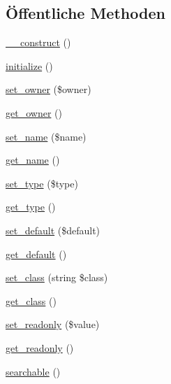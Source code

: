 \subsection*{Öffentliche Methoden}
\begin{DoxyCompactItemize}
\item 
\hyperlink{classSunhill_1_1Properties_1_1oo__property_a6b1a7e1df63cdee5c3d58625f968ed04}{\+\_\+\+\_\+construct} ()
\item 
\hyperlink{classSunhill_1_1Properties_1_1oo__property_a07ec1ce77d7088128eda4a39d30679dd}{initialize} ()
\item 
\hyperlink{classSunhill_1_1Properties_1_1oo__property_a1b97751fabe74a2295056aba5b7bd2c2}{set\+\_\+owner} (\$owner)
\item 
\hyperlink{classSunhill_1_1Properties_1_1oo__property_a8707f56ea7b58a58ce6f0a477ac83db8}{get\+\_\+owner} ()
\item 
\hyperlink{classSunhill_1_1Properties_1_1oo__property_a026fddedbb639dbcbfd9c1a4a51adcca}{set\+\_\+name} (\$name)
\item 
\hyperlink{classSunhill_1_1Properties_1_1oo__property_ab906676b3a0ff8ef7254c5ca414cc16b}{get\+\_\+name} ()
\item 
\hyperlink{classSunhill_1_1Properties_1_1oo__property_a8af77eb14beb2973cb8f33c4fed5fd72}{set\+\_\+type} (\$type)
\item 
\hyperlink{classSunhill_1_1Properties_1_1oo__property_a00479ce844d27aa79a781070aeedbb82}{get\+\_\+type} ()
\item 
\hyperlink{classSunhill_1_1Properties_1_1oo__property_af56af9157fe5d36220010fd1356b532b}{set\+\_\+default} (\$default)
\item 
\hyperlink{classSunhill_1_1Properties_1_1oo__property_aa2c90a84278fe9b3cc4960a402ffd432}{get\+\_\+default} ()
\item 
\hyperlink{classSunhill_1_1Properties_1_1oo__property_a42366744bb3a7ab25d68202daaf5162a}{set\+\_\+class} (string \$class)
\item 
\hyperlink{classSunhill_1_1Properties_1_1oo__property_a7b30bbbdc703584a793497b6ac0ac4ef}{get\+\_\+class} ()
\item 
\hyperlink{classSunhill_1_1Properties_1_1oo__property_a92610fd5d9964f2fe00ce17967db83b8}{set\+\_\+readonly} (\$value)
\item 
\hyperlink{classSunhill_1_1Properties_1_1oo__property_af4442f042ebe33e607240a6ba5a190c5}{get\+\_\+readonly} ()
\item 
\hyperlink{classSunhill_1_1Properties_1_1oo__property_a487e2c55388652d3f3eb4217f9abb9b0}{searchable} ()

\end{DoxyCompactItemize}
